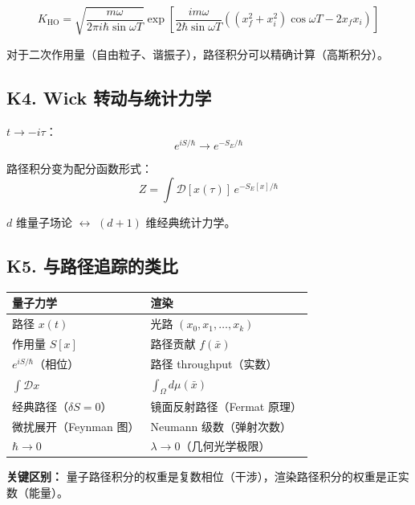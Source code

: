 \[
K_{\text{HO}} = \sqrt{\frac{m\omega}{2\pi i\hbar\sin\omega T}} \exp\left[\frac{im\omega}{2\hbar\sin\omega T}\left((x_f^2+x_i^2)\cos\omega T - 2x_fx_i\right)\right]
\]

对于二次作用量（自由粒子、谐振子），路径积分可以精确计算（高斯积分）。

\subsection{K4. Wick 转动与统计力学}

$t \to -i\tau$：
\[
e^{iS/\hbar} \to e^{-S_E/\hbar}
\]

路径积分变为配分函数形式：
\[
Z = \int \mathcal{D}[x(\tau)]\, e^{-S_E[x]/\hbar}
\]

$d$ 维量子场论 $\leftrightarrow$ $(d+1)$ 维经典统计力学。

\subsection{K5. 与路径追踪的类比}

\begin{center}
\begin{tabular}{ll}
\toprule
\textbf{量子力学} & \textbf{渲染} \\
\midrule
路径 $x(t)$ & 光路 $(x_0, x_1, \ldots, x_k)$ \\
作用量 $S[x]$ & 路径贡献 $f(\bar{x})$ \\
$e^{iS/\hbar}$（相位） & 路径 throughput（实数） \\
$\int \mathcal{D}x$ & $\int_\Omega d\mu(\bar{x})$ \\
经典路径（$\delta S = 0$） & 镜面反射路径（Fermat 原理） \\
微扰展开（Feynman 图） & Neumann 级数（弹射次数） \\
$\hbar \to 0$ & $\lambda \to 0$（几何光学极限） \\
\bottomrule
\end{tabular}
\end{center}

\textbf{关键区别：} 量子路径积分的权重是复数相位（干涉），渲染路径积分的权重是正实数（能量）。